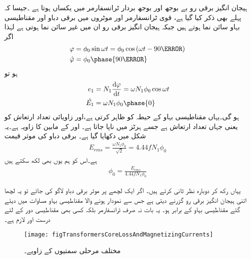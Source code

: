 ہیجان انگیز برقی رو بے بوجھ اور بوجھ بردار ٹرانسفارمر میں یکساں ہوتا ہے ۔جیسا کہ پہلے بھی ذکر کیا گیا ہے، قوی ٹرانسفارمر اور موٹروں میں برقی دباو اور مقناطیسی بہاو سائن نما ہوتے ہیں جبکہ ہیجان انگیز برقی رو ان میں غیر سائن نما ہوتی ہے لہٰذا اگر
\begin{gather}
\begin{aligned}
\varphi&=\phi_0 \sin \omega t=\phi_0 \cos \left(\omega t -90\degree \right)\\
\hat{\varphi}&=\phi_0 \phase{90\degree}
\end{aligned}
\end{gather}
ہو تو
\begin{gather}
\begin{aligned}\label{مساوات_ٹڑانسفارمر_دباو_سمتیہ}
e_1&=N_1 \frac{\dif \varphi}{\dif t}=\omega N_1 \phi_0 \cos \omega t\\
\hat{E_1}&=\omega N_1 \phi_0 \phase{0}
\end{aligned}
\end{gather}
ہو گی۔یہاں  مقناطیسی بہاو کے حیطہ کو ظاہر کرتی ہے،اور  زاویائی تعداد ارتعاش کو یعنی  جہاں  تعداد ارتعاش ہے جسے ہرٹز  میں ناپا جاتا ہے۔ اور  کے مابین  کا زاویہ ہے۔یہ شکل  میں دکھایا گیا ہے۔ برقی دباو  کی موثر قیمت   
\begin{align}
E_{rms}=\frac{\omega N_1 \phi_0}{\sqrt{2}}=4.44 f N_1 \phi_0
\end{align}
ہے۔اس کو ہم یوں بھی لکھ سکتے ہیں
\begin{align}\label{مساوات_ٹرانسفارمر_درکار_ہیجان_بہاو}
\phi_0=\frac{E_{rms}}{4.44 f N_1 \phi_0}
\end{align}

یہاں رکھ کر دوبارہ نظر ثانی کرتے ہیں۔ اگر ایک  لچھے پر  موثر برقی دباو لاگو کی جائے تو یہ لچھا اتنی ہیجان انگیز برقی رو  گزرنے دیتی ہے جس سے نمودار ہونے والا مقناطیسی بہاو مساوات   میں دیئے گئے مقناطیسی بہاو  کے برابر ہو۔ یہ بات نہ صرف ٹرانسفارمر بلکہ کسی بھی مقناطیسی دور کے لئے درست اور لازم ہے۔
\begin{figure}
\centering
\texttt{[image: figTransformersCoreLossAndMagnetizingCurrents]}
\caption{مختلف مرحلی سمتیوں کے زاویے۔}
\label{شکل_ٹرانسفارمر_مرکزی_ضیاع_اور_مقناطیسی_رو}
\end{figure}

